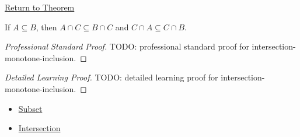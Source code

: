 \newpage
{}
\label{prf:intersection-monotone-inclusion}

\begin{remark*}[Return]
\hyperref[thm:intersection-monotone-inclusion]{Return to Theorem}
\end{remark*}

\begin{theorem*}
If $A\subseteq B$, then $A\cap C\subseteq B\cap C$ and
$C\cap A\subseteq C\cap B$.
\end{theorem*}

\begin{proof}[Professional Standard Proof]
\LRAProofBodyStart
TODO: professional standard proof for intersection-monotone-inclusion.
\end{proof}

\begin{proof}[Detailed Learning Proof]
\LRAProofBodyStart
TODO: detailed learning proof for intersection-monotone-inclusion.
\end{proof}

\begin{remark*}
\end{remark*}

\begin{dependencies}
\begin{itemize}
  \item \hyperref[def:subset]{Subset}
  \item \hyperref[def:intersection]{Intersection}
\end{itemize}
\end{dependencies}

\clearpage
